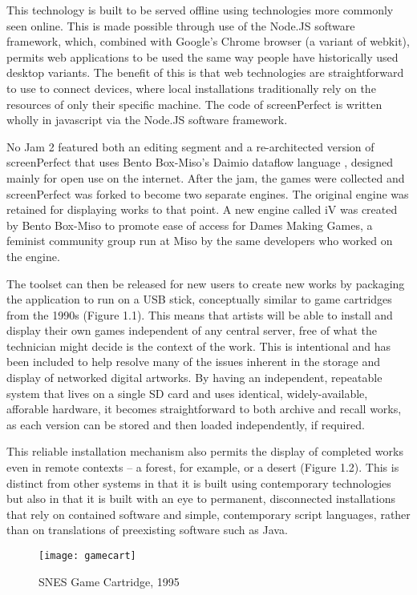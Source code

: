 This technology is built to be served offline using technologies more commonly seen online. This is made possible through use of the Node.JS software framework, which, combined with Google's Chrome browser (a variant of webkit), permits web applications to be used the same way people have historically used desktop variants. The benefit of this is that web technologies are straightforward to use to connect devices, where local installations traditionally rely on the resources of only their specific machine. The code of screenPerfect is written wholly in javascript via the Node.JS software framework.

No Jam 2 featured both an editing segment and a re-architected version of screenPerfect that uses Bento Box-Miso's Daimio dataflow language \parencite{daimio}, designed mainly for open use on the internet. After the jam, the games were collected and screenPerfect was forked to become two separate engines. The original engine was retained for displaying works to that point. A new engine called iV was created by Bento Box-Miso to promote ease of access for Dames Making Games, a feminist community group run at Miso by the same developers who worked on the engine.

The toolset can then be released for new users to create new works by packaging the application to run on a USB stick, conceptually similar to game cartridges from the 1990s (Figure 1.1). This means that artists will be able to install and display their own games independent of any central server, free of what the technician might decide is the context of the work. This is intentional and has been included to help resolve many of the issues inherent in the storage and display of networked digital artworks. By having an independent, repeatable system that lives on a single SD card and uses identical, widely-available, afforable hardware, it becomes straightforward to both archive and recall works, as each version can be stored and then loaded independently, if required.

This reliable installation mechanism also permits the display of completed works even in remote contexts – a forest, for example, or a desert (Figure 1.2). This is distinct from other systems in that it is built using contemporary technologies but also in that it is built with an eye to permanent, disconnected installations that rely on contained software and simple, contemporary script languages, rather than on translations of preexisting software such as Java.

\begin{figure}[!ht]
\centering
  \texttt{[image: gamecart]}
 \caption{SNES Game Cartridge, 1995}
\end{figure}


